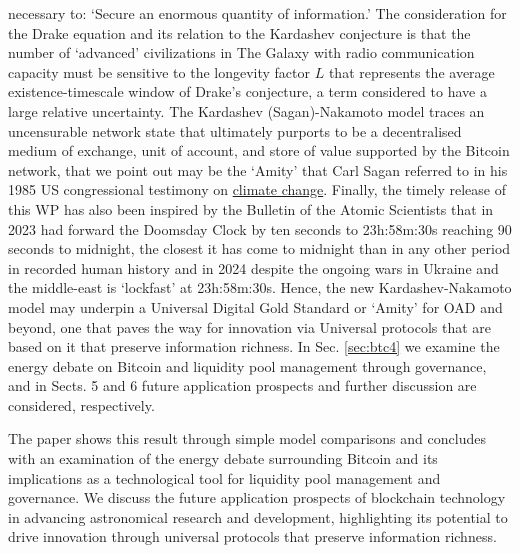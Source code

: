 \documentclass[final,5p,times,twocolumn,authoryear]{elsarticle}
\begin{document}
necessary to: `Secure an enormous quantity of information.' The consideration for the Drake equation and its relation to the Kardashev conjecture is that the number of `advanced' civilizations in The Galaxy with radio communication capacity must be sensitive to the longevity factor $L$ that represents the average existence-timescale window of Drake's conjecture, a term considered to have a large relative uncertainty. The Kardashev (Sagan)-Nakamoto model traces an uncensurable network state that ultimately purports to be a decentralised medium of exchange, unit of account, and store of value supported by the Bitcoin network, that we point out may be the `Amity' that Carl Sagan referred to in his 1985 US congressional testimony on  \href{https://www.youtube.com/watch?v=Wp-WiNXH6hI}{climate change}. Finally, the timely release of this WP has also been inspired by the Bulletin of the Atomic Scientists that in 2023 had forward the Doomsday Clock by ten seconds to 23h:58m:30s reaching 90 seconds to midnight, the closest it has come to midnight than in any other period in recorded human history and in 2024 despite the ongoing wars in Ukraine and the middle-east is `lockfast' at 23h:58m:30s. Hence, the new Kardashev-Nakamoto model may underpin a Universal Digital Gold Standard or `Amity' for OAD and beyond, one that paves the way for innovation via Universal protocols that are based on it that preserve information richness.  In Sec. \ref{sec:btc4} we examine the energy debate on Bitcoin and liquidity pool management through governance, and in Sects. 5 and 6 future application prospects and further discussion are considered, respectively.

The paper shows this result through simple model comparisons and concludes with an examination of the energy debate surrounding Bitcoin and its implications as a technological tool for liquidity pool management and governance. We discuss the future application prospects of blockchain technology in advancing astronomical research and development, highlighting its potential to drive innovation through universal protocols that preserve information richness.
\end{document}

